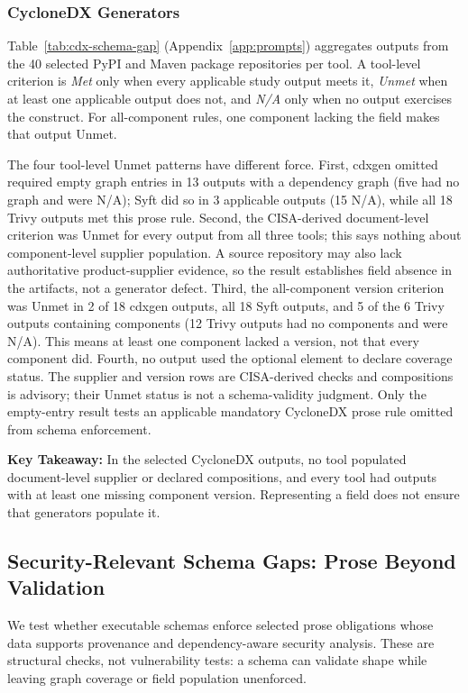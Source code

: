 \subsubsection{CycloneDX Generators}
Table~\ref{tab:cdx-schema-gap} (Appendix~\ref{app:prompts}) aggregates outputs from the 40 selected PyPI and Maven package repositories per tool. A tool-level criterion is \emph{Met} only when every applicable study output meets it, \emph{Unmet} when at least one applicable output does not, and \emph{N/A} only when no output exercises the construct. For all-component rules, one component lacking the field makes that output Unmet.

The four tool-level Unmet patterns have different force. First, cdxgen omitted required empty graph entries in 13 outputs with a dependency graph (five had no graph and were N/A); Syft did so in 3 applicable outputs (15 N/A), while all 18 Trivy outputs met this prose rule. Second, the CISA-derived document-level  criterion was Unmet for every output from all three tools; this says nothing about component-level supplier population. A source repository may also lack authoritative product-supplier evidence, so the result establishes field absence in the artifacts, not a generator defect. Third, the all-component version criterion was Unmet in 2 of 18 cdxgen outputs, all 18 Syft outputs, and 5 of the 6 Trivy outputs containing components (12 Trivy outputs had no components and were N/A). This means at least one component lacked a version, not that every component did. Fourth, no output used the optional  element to declare coverage status. The supplier and version rows are CISA-derived checks and compositions is advisory; their Unmet status is not a schema-validity judgment. Only the empty-entry result tests an applicable mandatory CycloneDX prose rule omitted from schema enforcement.

\begin{tcolorbox}[colback=gray!4!white, colframe=black!80, boxrule=0.5pt, arc=5pt, left=2pt, right=2pt, top=1pt, bottom=1pt]
\textbf{Key Takeaway:} In the selected CycloneDX outputs, no tool populated document-level supplier or declared compositions, and every tool had outputs with at least one missing component version. Representing a field does not ensure that generators populate it.
\end{tcolorbox}

\subsection{Security-Relevant Schema Gaps: Prose Beyond Validation}
\label{subsec:security-gaps}
We test whether executable schemas enforce selected prose obligations whose data supports provenance and dependency-aware security analysis. These are structural checks, not vulnerability tests: a schema can validate shape while leaving graph coverage or field population unenforced.

